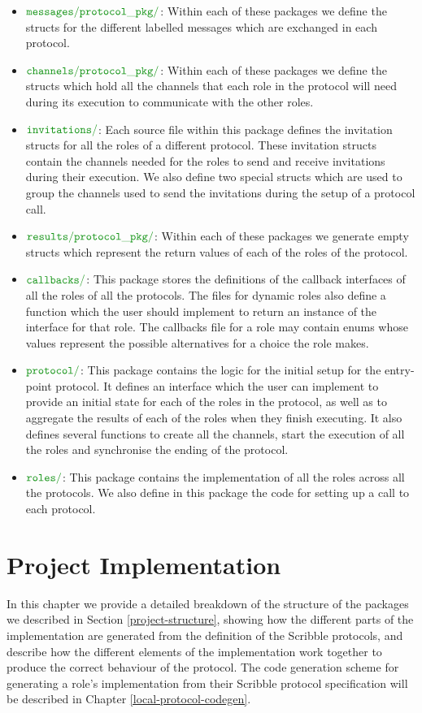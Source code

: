 \documentclass[12pt,twoside]{report}
\begin{document}
\begin{itemize}
    \item $\dirname{messages}\dirname{protocol\_pkg}$: Within each of these packages we define the structs for the different labelled messages which are exchanged in each protocol.
    \item  $\dirname{channels}\dirname{protocol\_pkg}$: Within each of these packages we define the structs which hold all the channels that each role in the protocol will need during its execution to communicate with the other roles.
    \item $\dirname{invitations}$: Each source file within this package defines the invitation structs for all the roles of a different protocol. These invitation structs contain the channels needed for the roles to send and receive invitations during their execution. We also define two special structs which are used to group the channels used to send the invitations during the setup of a protocol call. 
    \item $\dirname{results}\dirname{protocol\_pkg}$: Within each of these packages we generate empty structs which represent the return values of each of the roles of the protocol.
    \item $\dirname{callbacks}$: This package stores the definitions of the callback interfaces of all the roles of all the protocols. The files for dynamic roles also define a function which the user should implement to return an instance of the interface for that role. The callbacks file for a role may contain enums whose values represent the possible alternatives for a choice the role makes.
    \item $\dirname{protocol}$: This package contains the logic for the initial setup for the entry-point protocol. It defines an interface which the user can implement to provide an initial state for each of the roles in the protocol, as well as to aggregate the results of each of the roles when they finish executing. It also defines several functions to create all the channels, start the execution of all the roles and synchronise the ending of the protocol.
    \item $\dirname{roles}$: This package contains the implementation of all the roles across all the protocols. We also define in this package the code for setting up a call to each protocol.
\end{itemize}

\chapter{Project Implementation}\label{go-codegen}
In this chapter we provide a detailed breakdown of the structure of the packages we described in Section \ref{project-structure}, showing how the different parts of the implementation are generated from the definition of the Scribble protocols, and describe how the different elements of the implementation work together to produce the correct behaviour of the protocol. The code generation scheme for generating a role's implementation from their Scribble protocol specification will be described in Chapter \ref{local-protocol-codegen}.
\end{document}
